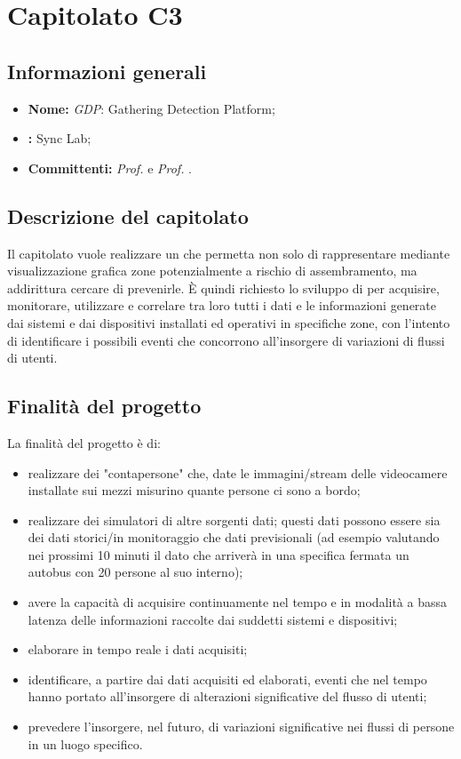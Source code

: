 \section{Capitolato C3}

\subsection{Informazioni generali}
\begin{itemize}
\item \textbf{Nome:} \textit{GDP}: Gathering Detection Platform;
\item \textbf{:} Sync Lab;
\item \textbf{Committenti:} \textit{Prof. \Tullio{}} e \textit{Prof. \Riccardo{}}.
\end{itemize}

\subsection{Descrizione del capitolato}
Il capitolato vuole realizzare un  che permetta non solo di rappresentare mediante visualizzazione grafica zone potenzialmente a rischio di assembramento, ma addirittura cercare di prevenirle. È quindi richiesto lo sviluppo di  per acquisire, monitorare, utilizzare e correlare tra loro tutti i dati e le informazioni generate dai sistemi e dai dispositivi installati ed operativi in specifiche zone, con l'intento di identificare i possibili eventi che concorrono all'insorgere di variazioni di flussi di utenti. 

\subsection{Finalità del progetto}
La finalità del progetto è di:
\begin{itemize}
\item realizzare dei  "contapersone" che, date le immagini/stream delle videocamere installate sui mezzi misurino quante persone ci sono a bordo;
\item realizzare dei simulatori di altre sorgenti dati; questi dati possono essere sia dei dati storici/in monitoraggio che dati previsionali
(ad esempio valutando nei prossimi 10 minuti il dato che arriverà in una specifica fermata un autobus con 20 persone al suo interno);
\item avere la capacità di acquisire continuamente nel tempo e in modalità a bassa latenza delle informazioni
raccolte dai suddetti sistemi e dispositivi;
\item elaborare in tempo reale i dati acquisiti;
\item identificare, a partire dai dati acquisiti ed elaborati, eventi che nel tempo hanno portato all'insorgere di alterazioni significative del flusso di utenti;
\item prevedere l'insorgere, nel futuro, di variazioni significative nei flussi di persone in un luogo specifico.
\end{itemize}
